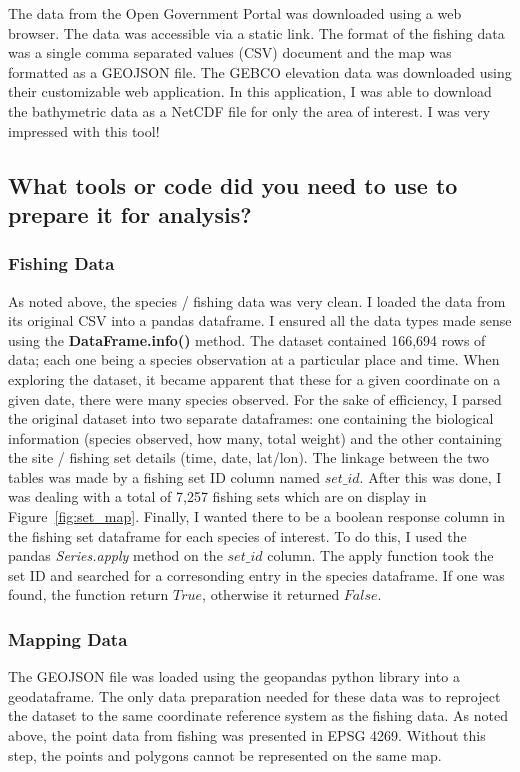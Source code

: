 The data from the Open Government Portal was downloaded using a web browser.
The data was accessible via a static link.
The format of the fishing data was a single comma separated values (CSV) document and the map was formatted as a GEOJSON file.
The GEBCO elevation data was downloaded using their customizable web application.
In this application, I was able to download the bathymetric data as a NetCDF file for only the area of interest.
I was very impressed with this tool!

\subsection{What tools or code did you need to use to prepare it for analysis?}

\subsubsection{Fishing Data}

As noted above, the species / fishing data was very clean.
I loaded the data from its original CSV into a pandas dataframe.
I ensured all the data types made sense using the \textbf{DataFrame.info()} method.
The dataset contained 166,694 rows of data; each one being a species observation at a particular place and time.
When exploring the dataset, it became apparent that these for a given coordinate on a given date, there were many species observed.
For the sake of efficiency, I parsed the original dataset into two separate dataframes:
one containing the biological information (species observed, how many, total weight)
and the other containing the site / fishing set details (time, date, lat/lon).
The linkage between the two tables was made by a fishing set ID column named $set\_id$.
After this was done, I was dealing with a total of 7,257 fishing sets which are on display in Figure~\ref{fig:set_map}.
Finally, I wanted there to be a boolean response column in the fishing set dataframe for each species of interest.
To do this, I used the pandas \textit{Series.apply} method on the $set\_id$ column.
The apply function took the set ID and searched for a corresonding entry in the species dataframe.
If one was found, the function return $True$, otherwise it returned $False$.

\subsubsection{Mapping Data}

The GEOJSON file was loaded using the geopandas python library into a geodataframe.
The only data preparation needed for these data was to reproject the dataset to the same coordinate reference system as the fishing data.
As noted above, the point data from fishing was presented in EPSG 4269.
Without this step, the points and polygons cannot be represented on the same map.

